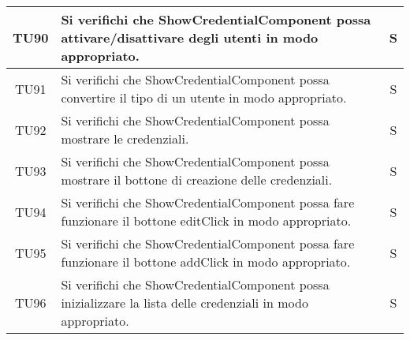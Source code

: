 \begin{center}
\begin{longtable}{|c|p{10cm}|c|}
			TU90 & Si verifichi che ShowCredentialComponent possa attivare/disattivare degli utenti in modo appropriato. & S \\
			\hline
			TU91 & Si verifichi che ShowCredentialComponent possa convertire il tipo di un utente in modo appropriato. & S \\
			\hline
			TU92 & Si verifichi che ShowCredentialComponent possa mostrare le credenziali. & S \\
			\hline
			TU93 & Si verifichi che ShowCredentialComponent possa mostrare il bottone di creazione delle credenziali. & S \\
			\hline
			TU94 & Si verifichi che ShowCredentialComponent possa fare funzionare il bottone editClick in modo appropriato. & S \\
			\hline	  
			TU95 & Si verifichi che ShowCredentialComponent possa fare funzionare il bottone addClick in modo appropriato. & S \\
			\hline
			TU96 & Si verifichi che ShowCredentialComponent possa inizializzare la lista delle credenziali in modo appropriato. & S \\
			\hline
			

\end{longtable}
\end{center}

